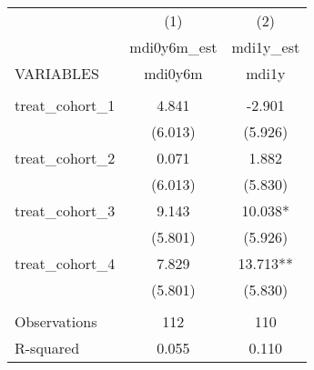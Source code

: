 \documentclass[]{article}
\begin{document}
\begin{tabular}{lcc} \hline
 & (1) & (2) \\
 & mdi0y6m\_est & mdi1y\_est \\
VARIABLES & mdi0y6m & mdi1y \\ \hline
 &  &  \\
treat\_cohort\_1 & 4.841 & -2.901 \\
 & (6.013) & (5.926) \\
treat\_cohort\_2 & 0.071 & 1.882 \\
 & (6.013) & (5.830) \\
treat\_cohort\_3 & 9.143 & 10.038* \\
 & (5.801) & (5.926) \\
treat\_cohort\_4 & 7.829 & 13.713** \\
 & (5.801) & (5.830) \\
 &  &  \\
Observations & 112 & 110 \\
 R-squared & 0.055 & 0.110 \\ \hline
\end{tabular}
\end{document}
